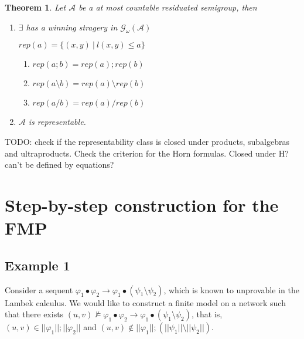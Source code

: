 \documentclass[a4paper]{article}
\theoremstyle{defin}
\theoremstyle{theorem}
\newtheorem{theorem}{Theorem}
\theoremstyle{claim}
\theoremstyle{prop}
\theoremstyle{lemma}
\theoremstyle{fact}
\theoremstyle{ex}
\theoremstyle{col}
\begin{document}
\begin{theorem}

Let $\mathcal{A}$ be a at most countable residuated semigroup, then

\begin{enumerate}
\item $\exists$ has a winning stragery in $\mathcal{G}_{\omega}(\mathcal{A})$

\begin{center}
$rep(a) = \{ (x,y) \: | \: l(x, y) \leq a \}$
\end{center}

\begin{enumerate}
\item $rep(a ; b) = rep(a) ; rep(b)$
\item $rep(a \setminus b) = rep(a) \setminus rep(b)$
\item $rep(a / b) = rep(a) / rep(b)$
\end{enumerate}

\item $\mathcal{A}$ is representable.
\end{enumerate}
\end{theorem}

TODO: check if the representability class is closed under products, subalgebras and ultraproducts. Check the criterion for the Horn formulas. Closed under H? can't be defined by equations?

\section{Step-by-step construction for the FMP}

\subsection{Example 1}

Consider a sequent $\varphi_1 \bullet \varphi_2 \rightarrow \varphi_1 \bullet (\psi_1 \setminus \psi_2)$, which is known to unprovable in the Lambek calculus. We would like to construct a finite model on a network such that there exists $(u, v) \nvDash \varphi_1 \bullet \varphi_2 \rightarrow \varphi_1 \bullet (\psi_1 \setminus \psi_2)$, that is, $(u, v) \in ||\varphi_1|| ; ||\varphi_2||$ and $(u, v) \notin ||\varphi_1|| ; (||\psi_1|| \setminus ||\psi_2||)$.
\end{document}

